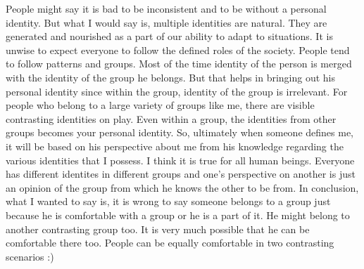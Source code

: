 People might say it is bad to be inconsistent and to be without a personal identity. But what I would say is, multiple identities are natural. They are generated and nourished as a part of our ability to adapt to situations. It is unwise to expect everyone to follow the defined roles of the society. People tend to follow patterns and groups. Most of the time identity of the person is merged with the identity of the group he belongs. But that helps in bringing out his personal identity since within the group, identity of the group is irrelevant. For people who belong to a large variety of groups like me, there are visible contrasting identities on play. Even within a group, the identities from other groups becomes your personal identity. So, ultimately when someone defines me, it will be based on his perspective about me from his knowledge regarding the various identities that I possess. I think it is true for all human beings. Everyone has different identites in different groups and one's perspective on another is just an opinion of the group from which he knows the other to be from. In conclusion, what I wanted to say is, it is wrong to say someone belongs to a group just because he is comfortable with a group or he is a part of it. He might belong to another contrasting group too. It is very much possible that he can be comfortable there too. People can be equally comfortable in two contrasting scenarios :)

\newpage 
